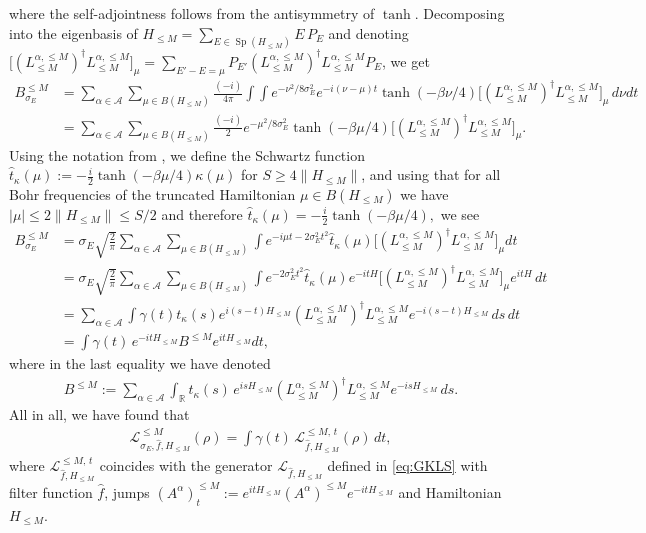 \documentclass[11pt]{amsart}
\newcommand{\1}{\mathbbm{1}}
\newcommand{\R}{\mathbb{R}}
\newcommand{\spec}{\operatorname{Sp}}
\newcommand{\cA}{\mathcal{A}}
\theoremstyle{plain}
\theoremstyle{definition}
\theoremstyle{remark}
\numberwithin{equation}{section}
\begin{document}
where the self-adjointness follows from the antisymmetry of $\tanh$. Decomposing into the eigenbasis of $H_{\le M} = \sum_{E\in\spec(H_{\le M})} E \,P_E$ and denoting $\big[(L_{\le M}^{\alpha,\le M})^\dagger L_{\le M}^{\alpha,\le M}\big]_\mu=\sum_{E'-E=\mu}P_{E'}(L_{\le M}^{\alpha,\le M})^\dagger L_{\le M}^{\alpha,\le M}P_{E}$, we get
\begin{align*}
B_{\sigma_E}^{\le M}&=\sum_{\alpha\in\mathcal{A}}\sum_{\mu\in B(H_{\le M})}\frac{(-i)}{4\pi}\int\int {e^{-\nu^2/8\sigma_E^2}}e^{-i(\nu-\mu) t}  \tanh(-\beta\nu/4)  \big[(L_{\le M}^{\alpha,\le M})^\dagger L_{\le M}^{\alpha,\le M} \big]_\mu\,d\nu dt\\
&=\sum_{\alpha\in\mathcal{A}}\sum_{\mu\in B(H_{\le M})}\frac{(-i)}{2} {e^{-\mu^2/8\sigma_E^2}}  \tanh(-\beta\mu/4)  \big[(L_{\le M}^{\alpha,\le M})^\dagger L_{\le M}^{\alpha,\le M} \big]_\mu.
\end{align*}
Using the notation from , we define the Schwartz function $\widehat{t}_\kappa(\mu):=-\frac{i}{2}\tanh(-\beta\mu/4)\kappa(\mu)$ for $S\ge 4\|H_{\le M}\|$, and using that for all Bohr frequencies of the truncated Hamiltonian $\mu\in B(H_{\le M})$ we have $|\mu|\le 2\|H_{\le M}\| \le S/2$ and therefore $\widehat t_\kappa(\mu) = -\frac{i}{2}\tanh(-\beta \mu/4),$ we see
\begin{align*}
B_{\sigma_E}^{\le M}&=\sigma_E\sqrt{\frac{2}{\pi}}\sum_{\alpha\in\mathcal{A}}\sum_{\mu\in B(H_{\le M})}\int e^{-i\mu t-2\sigma_E^2 t^2 }   \widehat{t}_\kappa(\mu)  \big[(L_{\le M}^{\alpha,\le M})^\dagger L_{\le M}^{\alpha,\le M} \big]_\mu dt\\
&=\sigma_E\sqrt{\frac{2}{\pi}}\sum_{\alpha\in\mathcal{A}}\sum_{\mu\in B(H_{\le M})}\int e^{-2\sigma_E^2 t^2 }   \widehat{t}_\kappa(\mu) e^{-itH} \big[(L_{\le M}^{\alpha,\le M})^\dagger L_{\le M}^{\alpha,\le M} \big]_\mu e^{itH}\,dt\\
&=\sum_{\alpha\in\mathcal{A}}\int \gamma(t)   {t}_\kappa(s) e^{i(s-t)H_{\le M}} (L_{\le M}^{\alpha,\le M})^\dagger L_{\le M}^{\alpha,\le M}  e^{-i(s-t)H_{\le M}}\,ds\,dt\\
&= \int \gamma(t)\,e^{-it H_{\le M}}B^{\le M}e^{itH_{\le M}}dt ,
\end{align*}
where in the last equality we have denoted 
\begin{align*}
   B^{\le M} := \sum_{\alpha\in\cA} \int_\R t_\kappa(s) \,e^{isH_{\le M}}\left(L^{\alpha,\le M}_{\le M}\right)^\dagger L^{\alpha,\le M}_{\le M}e^{-isH_{\le M}} \,ds. 
\end{align*}
All in all, we have found that 
\begin{align}\label{convcomb}
\mathcal{L}_{\sigma_E,\widehat{f},H_{\le M}}^{\le M}(\rho)=\int \gamma(t) \,\mathcal{L}_{\widehat{f},H_{\le M}}^{\le M,\,t}(\rho)\, dt,
\end{align}
where $\mathcal{L}_{\widehat{f},H_{\le M}}^{\le M,\,t}$ coincides with the generator $\mathcal{L}_{\widehat{f},H_{\le M}}$ defined in \eqref{eq:GKLS} with filter function $\widehat{f}$, jumps $\left(A^{\alpha}\right)^{\le M}_t:= e^{itH_{\le M}} (A^{\alpha})^{\le M} e^{-itH_{\le M}}$ and Hamiltonian $H_{\le M}$. 
\end{document}
